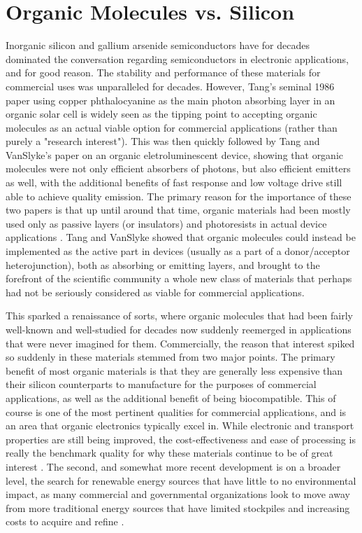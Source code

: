 \section{Organic Molecules vs. Silicon}



Inorganic silicon and gallium arsenide semiconductors have for decades dominated the conversation regarding semiconductors in  electronic applications, and for good reason.  The stability and performance of these materials for commercial uses was unparalleled for decades.  However, Tang's seminal 1986 paper using copper phthalocyanine as the main photon absorbing layer in an organic solar cell is widely seen as the tipping point to accepting organic molecules as an actual viable option for commercial applications (rather than purely a "research interest")\cite{Tang1986}.  This was then quickly followed by Tang and VanSlyke's paper on an organic eletroluminescent device, showing that organic molecules were not only efficient absorbers of photons, but also efficient emitters as well, with the additional benefits of fast response and low voltage drive still able to achieve quality emission\cite{Tang1987}.  The primary reason for the importance of these two papers is that up until around that time, organic materials had been mostly used only as passive layers (or insulators) and photoresists in actual device applications \cite{Shaw2001}.  Tang and VanSlyke showed that organic molecules could instead be implemented as the active part in devices (usually as a part of a donor/acceptor heterojunction), both as absorbing or emitting layers, and brought to the forefront of the scientific community a whole new class of materials that perhaps had not be seriously considered as viable for commercial applications.



This sparked a renaissance of sorts, where organic molecules that had been fairly well-known and well-studied for decades now suddenly reemerged in applications that were never imagined for them.  Commercially, the reason that interest spiked so suddenly in these materials stemmed from two major points.  The primary benefit of most organic materials is that they are generally less expensive than their silicon counterparts to manufacture for the purposes of commercial applications, as well as the additional benefit of being biocompatible.  This of course is one of the most pertinent qualities for commercial applications, and is an area that organic electronics typically excel in.  While electronic and transport properties are still being improved, the cost-effectiveness and ease of processing is really the benchmark quality for why these materials continue to be of great interest \cite{Shaw2001}.  The second, and somewhat more recent development is on a broader level, the search for renewable energy sources that have little to no environmental impact, as many commercial and governmental organizations look to move away from more traditional energy sources that have limited stockpiles and increasing costs to acquire and refine \cite{Kippelen2009} \cite{Cao2014}.



